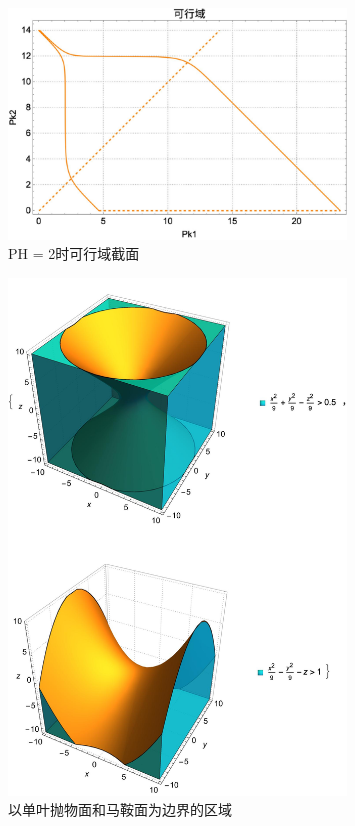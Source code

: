 \documentclass[UTF-8]{ctexart}
\newcommand{\0}{\boldsymbol{0}}
\begin{document}
   

\pagebreak

\begin{figure}[ht]
    \centering
    \includegraphics[width=0.8\textwidth]{截面a.jpeg}
    \caption{\kaishu PH = 2时可行域截面}
    \label{fig:截面a}
\end{figure}

\begin{figure}[ht]
    \centering
    \includegraphics[width=0.8\textwidth]{双曲面.jpeg}
    \caption{\kaishu 以单叶抛物面和马鞍面为边界的区域}
    \label{fig:边界区域}
\end{figure}
\end{document}
